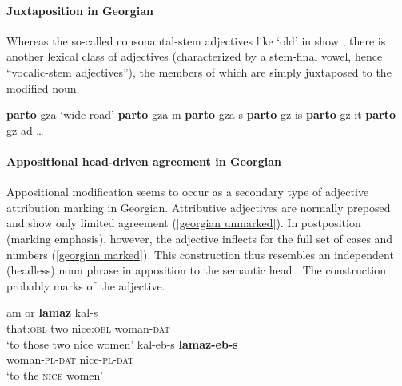 \paragraph*{Juxtaposition in Georgian}
Whereas the so-called consonantal-stem adjectives like ‘old’ in  show , there is another lexical class of adjectives (characterized by a stem-final vowel, hence “vocalic-stem adjectives”), the members of which are simply juxtaposed to the modified noun.
\begin{exe}
\settowidth{}
\begin{xlist}
\ex \textbf{parto} gza	{\rm ‘wide road’}	
\ex \textbf{parto} gza-m				
\ex \textbf{parto} gza-s				
\ex \textbf{parto} gz-is				
\ex \textbf{parto} gz-it				
\ex \textbf{parto} gz-ad				
\ex \dots
\end{xlist}
\end{exe}

\paragraph*{Appositional head\hyp{}driven agreement in Georgian}
Appositional modification seems to occur as a secondary type of adjective attribution marking in Georgian. Attributive adjectives are normally preposed and show only limited agreement (\ref{georgian unmarked}). In postposition (marking emphasis), however, the adjective inflects for the full set of cases and numbers (\ref{georgian marked}). This construction thus resembles an independent (headless) noun phrase in apposition to the semantic head \citep[652, 677]{testelec1998}. The construction probably marks  of the adjective.
\begin{exe}
\begin{xlist}
\ex 
\label{georgian unmarked}
\gll	am or \textbf{lamaz} kal-s\\
	that:\textsc{obl} two nice:\textsc{obl} woman-\textsc{dat}\\
\glt	‘to those two nice women’
\ex 
\label{georgian marked}
\gll	kal-eb-s \textbf{lamaz-eb-s}\\
	woman-\textsc{pl}-\textsc{dat} nice-\textsc{pl}-\textsc{dat}\\
\glt	‘to the \textsc{nice} women’
\end{xlist}
\end{exe}

